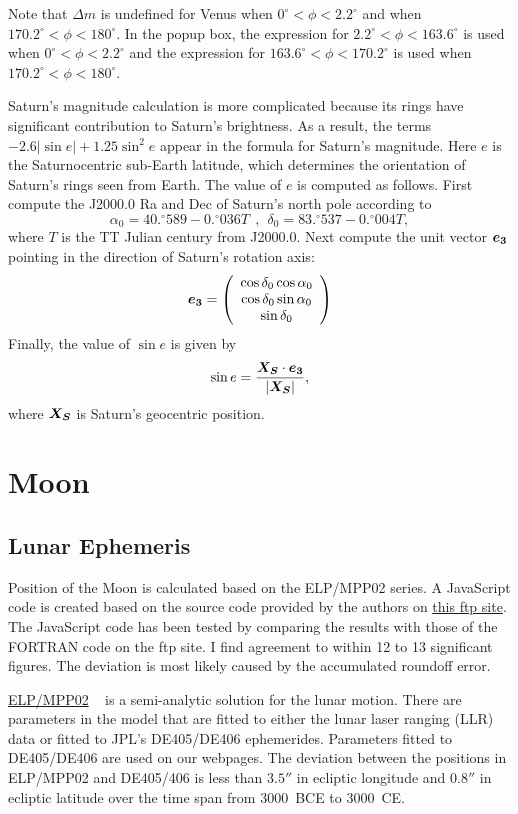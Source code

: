 \documentclass[12pt]{article}
\newcommand \beq {\begin{equation}}
\newcommand \eeq {\end{equation}}
\newcommand{\ve}[1]{\mbox{\boldmath $#1$}}
\begin{document}
Note that $\Delta m$ is undefined for Venus when $0^\circ < \phi < 2.2^\circ$ and 
when $170.2^\circ < \phi < 180^\circ$. In the popup box, the expression for 
$2.2^\circ < \phi < 163.6^\circ$ is used when $0^\circ < \phi < 2.2^\circ$ 
and the expression for $163.6^\circ < \phi < 170.2^\circ$ is used when 
$170.2^\circ < \phi < 180^\circ$.

Saturn's magnitude calculation is more complicated because its rings have 
significant contribution to Saturn's brightness. As a result, the terms 
$- 2.6 |\sin e| + 1.25\sin^2 e$ appear in the formula for Saturn's magnitude. 
Here $e$ is the Saturnocentric sub-Earth latitude, which determines the orientation 
of Saturn's rings seen from Earth. The value of $e$ is computed as follows.
First compute the J2000.0 Ra and Dec of Saturn's north pole according to 
\beq
  \alpha_0 = 40.^{\circ}589 - 0.^{\circ}036 T \ \ , \ \ 
  \delta_0 = 83.^{\circ}537 - 0.^{\circ}004 T ,
\eeq
where $T$ is the TT Julian century from J2000.0. Next compute the 
unit vector $\ve{e_3}$ pointing in the direction of Saturn's rotation axis:
\beq
\ve{e_3} = \left( \begin{array}{c} 
\cos \delta_0 \cos \alpha_0 \\ \cos \delta_0 \sin \alpha_0 \\ \sin \delta_0 
\end{array} \right) 
\label{eq:SaturnE3}
\eeq
Finally, the value of $\sin e$ is given by 
\beq
  \sin e = \frac{\ve{X_S}\cdot \ve{e_3}}{|\ve{X_S}|} ,
\eeq
where $\ve{X_S}$ is Saturn's geocentric position.

\section{Moon}

\subsection{Lunar Ephemeris}

Position of the Moon is calculated based on the ELP/MPP02 series. A JavaScript 
code is created based on the source code provided by the authors on 
\href{ftp://cyrano-se.obspm.fr/pub/2_lunar_solutions/2_elpmpp02/}{this ftp site}. 
The JavaScript code has been tested by comparing the results with those of the 
FORTRAN code on the ftp site. I find agreement to within 12 to 13 significant figures. 
The deviation is most likely caused by the accumulated roundoff error. 

\href{https://ui.adsabs.harvard.edu/abs/2003A%26A...404..735C/abstract}{ELP/MPP02} \
is a semi-analytic solution for the lunar motion. There are 
parameters in the model that are fitted to either the lunar 
laser ranging (LLR) data or fitted to JPL's DE405/DE406 ephemerides. 
Parameters fitted to DE405/DE406 are used on our webpages. The deviation between 
the positions in ELP/MPP02 and DE405/406 is less than $3.5''$ in ecliptic longitude 
and $0.8''$ in ecliptic latitude over the time span from 3000~BCE to 3000~CE. 
\end{document}
